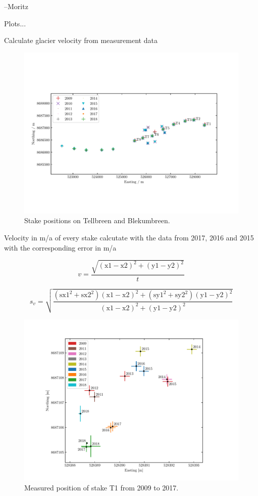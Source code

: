 --Moritz


Plots...

Calculate glacier velocity from measurement data

\begin{figure}[H]
    \centering
    \includegraphics[width=\textwidth]{../fig/stakePositions.pdf}
    \caption{Stake positions on Tellbreen and Blekumbreen.}
    \label{GF:fig:stakepos}
\end{figure}

\begin{table}[h]
	\caption{Velocity in m/a of every stake calcutate with the data from 2017, 2016 and 2015 with the corresponding error in m/a}
	\centering
	\scriptsize
	
	\label{GPS:tab:os_tab}
\end{table}

\begin{equation}
v = \frac{\sqrt{(\text{x1}-\text{x2})^2+(\text{y1}-\text{y2})^2}}{t}
\end{equation}

\begin{equation}
s_v = 
\sqrt{\frac
{\left(\text{sx1}^2+\text{sx2}^2\right)(\text{x1}-\text{x2})^2+
\left(\text{sy1}^2+\text{sy2}^2\right)(\text{y1}-\text{y2})^2}
{(\text{x1}-\text{x2})^2+(\text{y1}-\text{y2})^2}}
\end{equation}


\begin{figure}[H]
    \centering
    \includegraphics[width=\textwidth]{../fig/T1_2d.pdf}
    \caption{Measured position of stake T1 from 2009 to 2017.}
    \label{GF:fig:T1_2d}
\end{figure}
